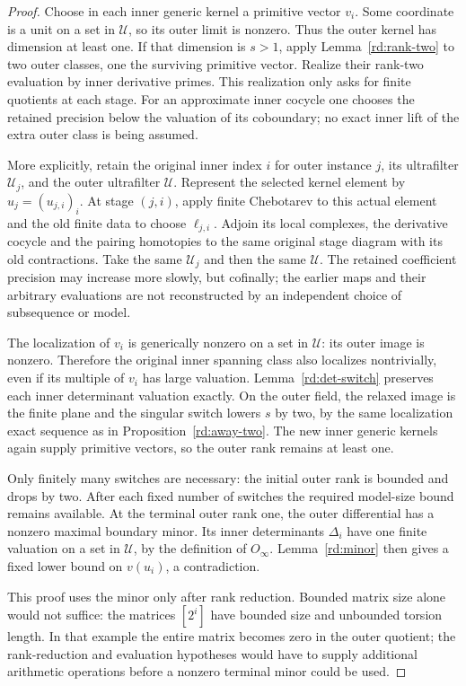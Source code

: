 \begin{proof}
Choose in each inner generic kernel a primitive vector \(v_i\).
Some coordinate is a unit on a set in \(\mathcal U\), so its
outer limit is nonzero.  Thus the outer kernel has dimension
at least one.  If that dimension is \(s>1\), apply
Lemma~\ref{rd:rank-two} to two outer classes, one the surviving
primitive vector.  Realize their rank-two evaluation by inner
derivative primes.  This realization only asks for finite
quotients at each stage.  For an approximate inner cocycle
one chooses the retained precision below the valuation of
its coboundary; no exact inner lift of the extra outer class
is being assumed.

More explicitly, retain the original inner index \(i\)
for outer instance \(j\), its ultrafilter \(\mathcal U_j\),
and the outer ultrafilter \(\mathcal U\).  Represent the
selected kernel element by \(u_j=(u_{j,i})_i\).
At stage \((j,i)\), apply finite Chebotarev to this actual
element and the old finite data to choose \(\ell_{j,i}\).
Adjoin its local complexes, the derivative cocycle and
the pairing homotopies to the same original stage
diagram with its old contractions.  Take the same
\(\mathcal U_j\) and then the same \(\mathcal U\).
The retained coefficient precision may increase more
slowly, but cofinally; the earlier maps and their
arbitrary evaluations are not reconstructed by an
independent choice of subsequence or model.

The localization of \(v_i\) is generically nonzero on a set
in \(\mathcal U\): its outer image is nonzero.  Therefore
the original inner spanning class also localizes nontrivially,
even if its multiple of \(v_i\) has large valuation.
Lemma~\ref{rd:det-switch} preserves each inner determinant
valuation exactly.  On the outer field, the relaxed image
is the finite plane and the singular switch lowers \(s\)
by two, by the same localization exact sequence as in
Proposition~\ref{rd:away-two}.  The new inner generic kernels
again supply primitive vectors, so the outer rank remains
at least one.

Only finitely many switches are necessary: the initial outer
rank is bounded and drops by two.  After each fixed number
of switches the required model-size bound remains available.
At the terminal outer rank one, the outer differential has
a nonzero maximal boundary minor.  Its inner determinants
\(\Delta_i\) have one finite valuation on a set in
\(\mathcal U\), by the definition of \(O_\infty\).
Lemma~\ref{rd:minor} then gives a fixed lower bound on
\(v(u_i)\), a contradiction.

This proof uses the minor only after rank reduction.  Bounded
matrix size alone would not suffice: the matrices \([2^i]\)
have bounded size and unbounded torsion length.  In that
example the entire matrix becomes zero in the outer quotient;
the rank-reduction and evaluation hypotheses would have to
supply additional arithmetic operations before a nonzero
terminal minor could be used.
\end{proof}

